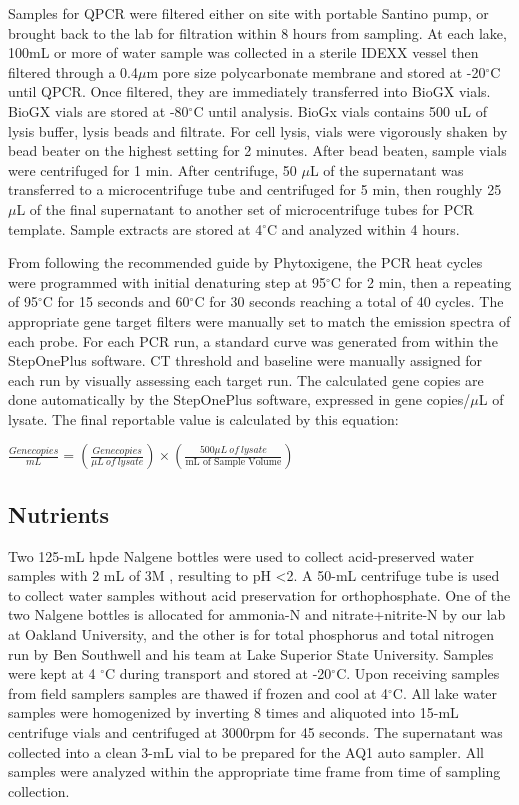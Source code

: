 Samples for QPCR were filtered either on site with portable Santino pump, or brought back to the lab for filtration within 8 hours from sampling.
At each lake, 100mL or more of water sample was collected in a sterile IDEXX vessel then filtered through a 0.4$\mu$m pore size polycarbonate membrane  and stored at -20$^\circ$C until QPCR. Once filtered, they are immediately transferred into BioGX vials. BioGX vials are stored at -80$^\circ$C until analysis. BioGx vials contains 500 uL of lysis buffer, lysis beads and filtrate. For cell lysis, vials were vigorously shaken by bead beater on the highest setting for 2 minutes. After bead beaten, sample vials were centrifuged for 1 min. After centrifuge, 50 $\mu$L of the supernatant was transferred to a microcentrifuge tube and centrifuged for 5 min, then roughly 25 $\mu$L of the final supernatant to another set of microcentrifuge tubes for PCR template.  Sample extracts are stored at 4$^\circ$C and analyzed within 4 hours.

From following the recommended guide by Phytoxigene, the PCR heat cycles were programmed with initial denaturing step at 95$^\circ$C for 2 min, then a repeating of 95$^\circ$C for 15 seconds and 60$^\circ$C for 30 seconds reaching a total of 40 cycles. The appropriate gene target filters were manually set to match the emission spectra of each probe.  For each PCR run, a standard curve was generated  from within the StepOnePlus software. CT threshold and baseline were manually assigned for each run by visually assessing each target run. The calculated gene copies are done automatically by the StepOnePlus software, expressed in gene copies/$\mu$L of lysate. The final reportable value is calculated by this equation:

\begin{center}
	$\frac{Genecopies}{mL} = (\frac{Genecopies}{\mu L \: of \: lysate}) \times (\frac{500\mu L \: of \: lysate}{\text{mL of Sample Volume}})$
\end{center}

\subsection{Nutrients}

Two 125-mL \gls{hpde} Nalgene bottles were used to collect acid-preserved water samples with 2 mL of 3M , resulting to pH \textless 2. A 50-mL centrifuge tube is used to collect water samples without acid preservation for orthophosphate. One of the two Nalgene bottles is allocated for ammonia-N and nitrate+nitrite-N by our lab at Oakland University, and the other is for total phosphorus and total nitrogen run by Ben Southwell and his team at Lake Superior State University.  Samples were kept  at 4 $^\circ$C during transport and stored at -20$^\circ$C. Upon receiving samples from field samplers samples are thawed if frozen and cool at 4$^\circ$C. All lake water samples were homogenized by inverting 8 times and aliquoted into 15-mL centrifuge vials and centrifuged at 3000rpm for 45 seconds. The supernatant was collected into a clean 3-mL vial to be prepared for the AQ1 auto sampler. All samples were analyzed within the appropriate time frame from time of sampling collection.

